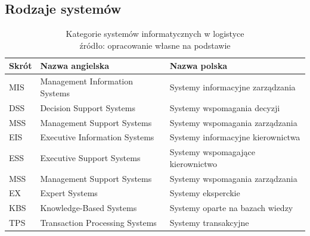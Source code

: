 	\subsection{Rodzaje systemów}
		\begin{table}[!h]
			\centering
			\begin{tabular}{|l|l|l|}
				\hline				
				\textbf{Skrót} 		& \textbf{Nazwa angielska}						& \textbf{Nazwa polska} \\
				\hline
				MIS					& Management Information Systems 				& Systemy informacyjne zarządzania	\\
				\hline
				DSS					& Decision Support Systems						& Systemy wspomagania decyzji		\\
				\hline
				MSS					& Management Support Systems					& Systemy wspomagania zarządzania	\\
				\hline	
				EIS					& Executive Information Systems					& Systemy informacyjne kierownictwa	\\
				\hline	
				ESS					& Executive Support Systems						& Systemy wspomagające kierownictwo	\\
				\hline	
				MSS					& Management Support Systems					& Systemy wspomagania zarządzania	\\
				\hline	
				EX					& Expert Systems								& Systemy eksperckie	\\
				\hline	
				KBS					& Knowledge-Based Systems						& Systemy oparte na bazach wiedzy	\\
				\hline	
				TPS					& Transaction Processing Systems				& Systemy transakcyjne	\\
				\hline
			\end{tabular}
			\caption[Kategorie systemów informatycznych w logistyce]{
				Kategorie systemów informatycznych w logistyce\\
				źródło: opracowanie własne na podstawie \cite{IDL}
			}
		\end{table}
		
